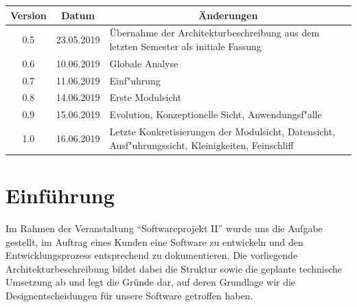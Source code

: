 \documentclass[enabledeprecatedfontcommands,fontsize=12pt,paper=a4,twoside,parskip=half]{scrartcl}
\begin{document}


\newpage

  \thispagestyle{fancy}
  \fancyhead{}
  \fancyfoot{}
  \renewcommand{\headrulewidth}{0.4pt}
  \tableofcontents

\newpage







\begin{tabular}{ccp{}}
\textbf{Version} & \textbf{Datum} & \multicolumn{1}{c}{\textbf{Änderungen}} \\\toprule
0.5 & 23.05.2019 & Übernahme der Architekturbeschreibung aus dem letzten Semester als initiale Fassung\\
0.6 & 10.06.2019 & Globale Analyse\\
0.7 & 11.06.2019 & Einf"uhrung\\
0.8 & 14.06.2019 & Erste Modulsicht\\
0.9 & 15.06.2019 & Evolution, Konzeptionelle Sicht, Anwendungsf"alle\\
1.0 & 16.06.2019 & Letzte Konkretisierungen der Modulsicht, Datensicht, Ausf"uhrungssicht, Kleinigkeiten, Feinschliff
\end{tabular}

\clearpage

\section{Einführung}

Im Rahmen der Veranstaltung \enquote{Softwareprojekt II} wurde uns die Aufgabe gestellt, im Auftrag eines Kunden eine Software zu entwickeln und den Entwicklungsprozess entsprechend zu dokumentieren. Die vorliegende Architekturbeschreibung bildet dabei die Struktur sowie die geplante technische Umsetzung ab und legt die Gründe dar, auf deren Grundlage wir die Designentscheidungen für unsere Software getroffen haben.
\end{document}
